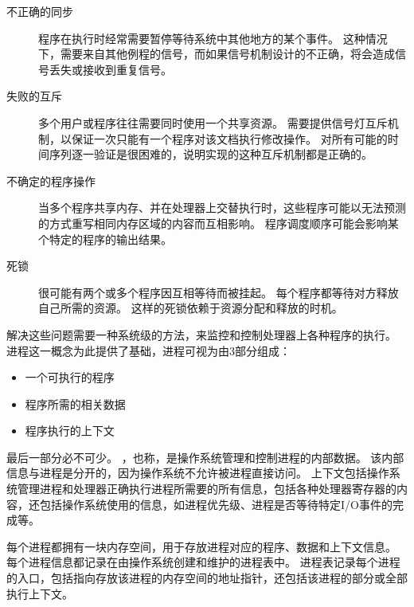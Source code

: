 {{        \begin{description}
            \item[不正确的同步]
            {
                程序在执行时经常需要暂停等待系统中其他地方的某个事件。
                这种情况下，需要来自其他例程的信号，而如果信号机制设计的不正确，将会造成信号丢失或接收到重复信号。
            }
            \item[失败的互斥]
            {
                多个用户或程序往往需要同时使用一个共享资源。
                需要提供信号灯互斥机制，以保证一次只能有一个程序对该文档执行修改操作。
                对所有可能的时间序列逐一验证是很困难的，说明实现的这种互斥机制都是正确的。
            }
            \item[不确定的程序操作]
            {
                当多个程序共享内存、并在处理器上交替执行时，这些程序可能以无法预测的方式重写相同内存区域的内容而互相影响。
                程序调度顺序可能会影响某个特定的程序的输出结果。
            }
            \item[死锁]
            {
                很可能有两个或多个程序因互相等待而被挂起。
                每个程序都等待对方释放自己所需的资源。
                这样的死锁依赖于资源分配和释放的时机。
            }
        \end{description}

        解决这些问题需要一种系统级的方法，来监控和控制处理器上各种程序的执行。
        进程这一概念为此提供了基础，进程可视为由3部分组成：

        \begin{itemize}
            \item 一个可执行的程序
            \item 程序所需的相关数据
            \item 程序执行的上下文
        \end{itemize}

        最后一部分必不可少。
        ，也称，是操作系统管理和控制进程的内部数据。
        该内部信息与进程是分开的，因为操作系统不允许被进程直接访问。
        上下文包括操作系统管理进程和处理器正确执行进程所需要的所有信息，包括各种处理器寄存器的内容，还包括操作系统使用的信息，如进程优先级、进程是否等待特定I/O事件的完成等。

        每个进程都拥有一块内存空间，用于存放进程对应的程序、数据和上下文信息。
        每个进程信息都记录在由操作系统创建和维护的进程表中。
        进程表记录每个进程的入口，包括指向存放该进程的内存空间的地址指针，还包括该进程的部分或全部执行上下文。

}}
